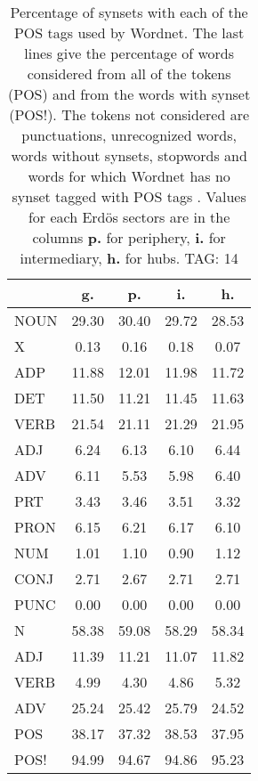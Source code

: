 \begin{table}[h!]
\begin{center}
\begin{tabular}{| l || c | c | c | c |}\hline
 & {\bf g.} & {\bf p.} & {\bf i.} & {\bf h.} \\\hline\hline
NOUN & 29.30  & 30.40  & 29.72  & 28.53 \\
X & 0.13  & 0.16  & 0.18  & 0.07 \\\hline
ADP & 11.88  & 12.01  & 11.98  & 11.72 \\
DET & 11.50  & 11.21  & 11.45  & 11.63 \\\hline
VERB & 21.54  & 21.11  & 21.29  & 21.95 \\\hline
ADJ & 6.24  & 6.13  & 6.10  & 6.44 \\
ADV & 6.11  & 5.53  & 5.98  & 6.40 \\\hline
PRT & 3.43  & 3.46  & 3.51  & 3.32 \\
PRON & 6.15  & 6.21  & 6.17  & 6.10 \\
NUM & 1.01  & 1.10  & 0.90  & 1.12 \\
CONJ & 2.71  & 2.67  & 2.71  & 2.71 \\
PUNC & 0.00  & 0.00  & 0.00  & 0.00 \\\hline\hline\hline
N & 58.38  & 59.08  & 58.29  & 58.34 \\\hline
ADJ & 11.39  & 11.21  & 11.07  & 11.82 \\\hline
VERB & 4.99  & 4.30  & 4.86  & 5.32 \\\hline
ADV & 25.24  & 25.42  & 25.79  & 24.52 \\\hline\hline
POS & 38.17  & 37.32  & 38.53  & 37.95 \\\hline
POS! & 94.99  & 94.67  & 94.86  & 95.23 \\\hline
\end{tabular}
\caption{Percentage of synsets with each of the POS tags used by Wordnet. The last lines give the percentage of words considered from all of the tokens (POS) and from the words with synset (POS!). The tokens not considered are punctuations, unrecognized words, words without synsets, stopwords and words for which Wordnet has no synset  tagged with POS tags . Values for each Erd\"os sectors are in the columns {{\bf p.}} for periphery, {{\bf i.}} for intermediary, {{\bf h.}} for hubs. TAG: 14}
\end{center}
\end{table}
